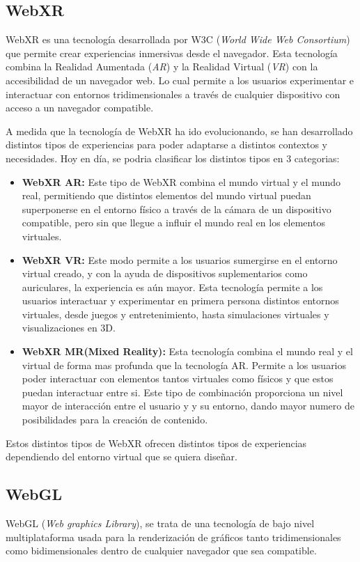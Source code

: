 \documentclass[a4paper, 12pt]{book}
\begin{document}
\subsection{WebXR}
\label{subsec:WebXR}

WebXR \cite{onirix2024} es una tecnología desarrollada por W3C (\textit{World Wide Web Consortium}) que permite crear experiencias inmersivas desde el navegador. Esta tecnología combina la Realidad Aumentada (\textit{AR}) y la Realidad Virtual (\textit{VR}) con la accesibilidad de un navegador web.
Lo cual permite a los usuarios experimentar e interactuar con entornos tridimensionales a través de cualquier dispositivo con acceso a un navegador compatible.

A medida que la tecnología de WebXR ha ido evolucionando, se han desarrollado distintos tipos de experiencias para poder adaptarse a distintos contextos y necesidades. Hoy en día, se podria clasificar los distintos tipos en 3 categorias:
\begin{itemize}
	\item \textbf{WebXR AR:} Este tipo de WebXR combina el mundo virtual y el mundo real, permitiendo que distintos elementos del mundo virtual puedan superponerse en el entorno físico a través
	      de la cámara de un dispositivo compatible, pero sin que llegue a influir el mundo real en los elementos virtuales.
	\item \textbf{WebXR VR:} Este modo permite a los usuarios sumergirse en el entorno virtual creado, y con la ayuda de dispositivos suplementarios como auriculares, la experiencia es aún mayor. Esta tecnología permite a los usuarios
	      interactuar y experimentar en primera persona distintos entornos virtuales, desde juegos y entretenimiento, hasta simulaciones virtuales y visualizaciones en 3D.
	\item \textbf{WebXR MR(Mixed Reality):} Esta tecnología combina el mundo real y el virtual de forma mas profunda que la tecnología AR. Permite a los usuarios poder interactuar con elementos tantos virtuales como físicos y que estos puedan interactuar entre si. Este tipo de combinación proporciona un nivel mayor de interacción entre el usuario y
	      y su entorno, dando mayor numero de posibilidades para la creación de contenido.
\end{itemize}

Estos distintos tipos de WebXR ofrecen distintos tipos de experiencias dependiendo del entorno virtual que se quiera diseñar.

\subsection{WebGL}
\label{subsec:WebGL}
WebGL (\textit{Web graphics Library}), se trata de una tecnología de bajo nivel multiplataforma usada para la renderización de gráficos tanto tridimensionales como bidimensionales dentro de cualquier navegador que sea compatible.
\end{document}
